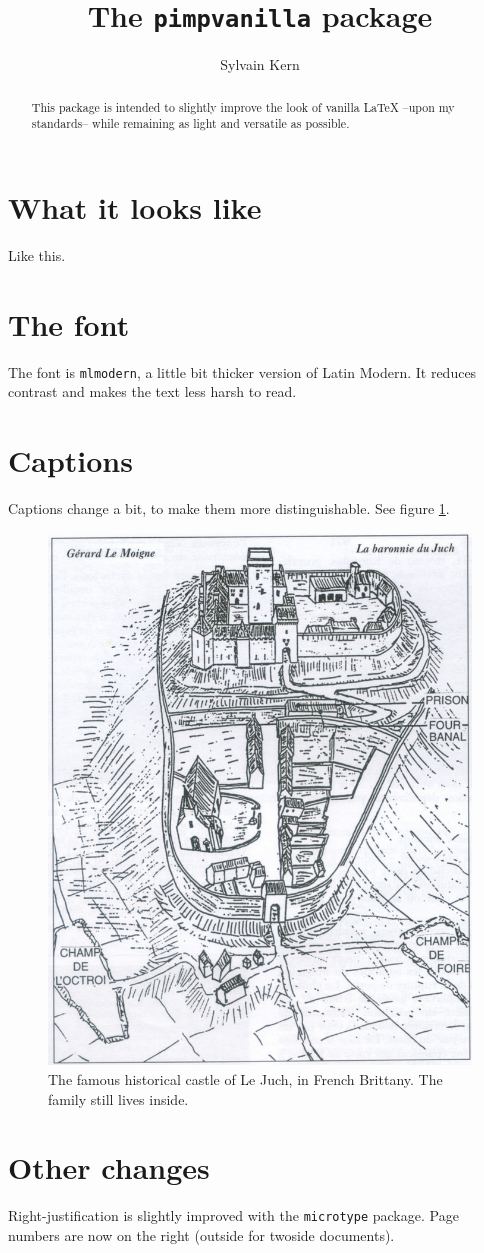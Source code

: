 \documentclass[12pt]{article}
\title{The \texttt{pimpvanilla} package}
\author{Sylvain Kern}
\begin{document}
\maketitle

\begin{abstract}
    This package is intended to slightly improve the look of vanilla \LaTeX{} --upon my standards-- while remaining as light and versatile as possible.
\end{abstract}

\section{What it looks like}

Like this. \lipsum[1-2]

\section{The font}

The font is \texttt{mlmodern}, a little bit thicker version of Latin Modern. It reduces contrast and makes the text less harsh to read.

\section{Captions}

Captions change a bit, to make them more distinguishable. See figure \ref{fig:juch}.

\begin{figure}
    \centering
    \includegraphics[width=.75\linewidth]{lejuch.png}
    \caption{The famous historical castle of Le Juch, in French Brittany. The family still lives inside.\lipsum[3] \label{fig:juch}}
\end{figure}


\section{Other changes}

Right-justification is slightly improved with the \texttt{microtype} package. Page numbers are now on the right (outside for twoside documents). \lipsum
\end{document}

